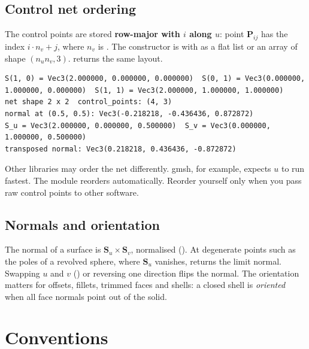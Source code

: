 \subsection{Control net ordering}
The control points are stored \textbf{row-major with $i$ along $u$}: point $\mathbf P_{ij}$ has
the index $i\cdot n_v + j$, where $n_v$ is . The constructor is
 with  as a flat list or an array of shape
$(n_u n_v, 3)$.  returns the same layout.


\begin{lstlisting}[style=text]
S(1, 0) = Vec3(2.000000, 0.000000, 0.000000)  S(0, 1) = Vec3(0.000000, 1.000000, 0.000000)  S(1, 1) = Vec3(2.000000, 1.000000, 1.000000)
net shape 2 x 2  control_points: (4, 3)
normal at (0.5, 0.5): Vec3(-0.218218, -0.436436, 0.872872)
S_u = Vec3(2.000000, 0.000000, 0.500000)  S_v = Vec3(0.000000, 1.000000, 0.500000)
transposed normal: Vec3(0.218218, 0.436436, -0.872872)
\end{lstlisting}

\begin{warning}
Other libraries may order the net differently. gmsh, for example, expects $u$ to run fastest.
The  module reorders automatically. Reorder yourself only when you pass raw
control points to other software.
\end{warning}

\subsection{Normals and orientation}
The normal of a surface is $\mathbf S_u\times\mathbf S_v$, normalised
(). At degenerate points such as the poles of a revolved sphere,
where $\mathbf S_u$ vanishes, \NF{} returns the limit normal. Swapping $u$ and $v$
() or reversing one direction flips the normal. The orientation
matters for offsets, fillets, trimmed faces and shells: a closed shell is \emph{oriented} when
all face normals point out of the solid.

\section{Conventions}\label{sec:concepts-conventions}

